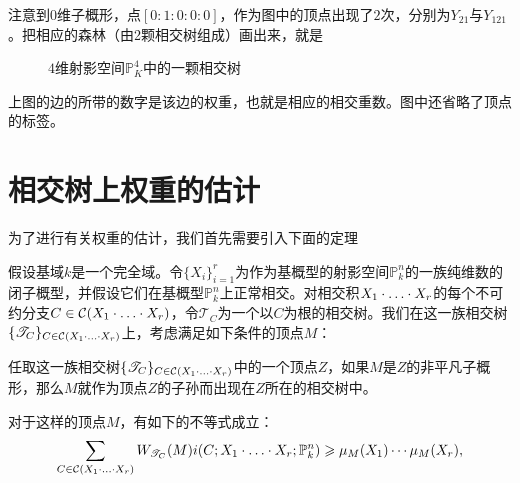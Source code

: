 \begin{example}
注意到$0$维子概形，点$[0:1:0:0:0]$，作为图中的顶点出现了$2$次，分别为$Y_{21}$与$Y_{121}$。把相应的森林（由2颗相交树组成）画出来，就是
\begin{figure}[H]
\centering
{}
\caption{$4$维射影空间$\mathbb{P}_K^4$中的一颗相交树}
\end{figure}
上图的边的所带的数字是该边的权重，也就是相应的相交重数。图中还省略了顶点的标签。
\end{example}

\section{相交树上权重的估计}
为了进行有关权重的估计，我们首先需要引入下面的定理

\begin{theorem}
\label{mult in the intersection tree}
假设基域$k$是一个完全域。令$\{X_i\}_{i=1}^r$为作为基概型的射影空间$\mathbb P^n_k$的一族纯维数的闭子概型，并假设它们在基概型$\mathbb P^n_k$上正常相交。对相交积$X_1\cdot\ldots\cdot X_r$的每个不可约分支$C \in \mathcal C(X_1\cdot\ldots\cdot X_r)$，令$\mathscr T_C$为一个以$C$为根的相交树。我们在这一族相交树$\{\mathscr T_C\}_{C\in\mathcal C(X_1\cdot\ldots\cdot X_r)}$上，考虑满足如下条件的顶点$M$：

\vspace{2em}
\begin{minipage}[t]{\linewidth-3\parindent}
{\kaishu 任取这一族相交树$\{\mathscr T_C\}_{C\in\mathcal C(X_1\cdot\ldots\cdot X_r)}$中的一个顶点$Z$，如果$M$是$Z$的非平凡子概形，那么$M$就作为顶点$Z$的子孙而出现在$Z$所在的相交树中。}
\end{minipage}
\vspace{2em}

对于这样的顶点$M$，有如下的不等式成立：
\begin{equation}
\label{no auxillary scheme}
\sum_{C\in\mathcal C(X_1\cdot\ldots\cdot X_r)} W_{\mathscr T_C}(M)i(C;X_1\cdot\ldots\cdot X_r;\mathbb P^n_k)\geqslant \mu_{M}(X_1)\cdots\mu_{M}(X_r),
\end{equation}
\end{theorem}

